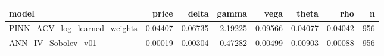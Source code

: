 \begin{tabular}{lrrrrrrr}
\toprule
model & price & delta & gamma & vega & theta & rho & n \\
\midrule
PINN_ACV_log_learned_weights & 0.04407 & 0.06735 & 2.19225 & 0.09566 & 0.04077 & 0.04042 & 956 \\
ANN_IV_Sobolev_v01 & 0.00019 & 0.00304 & 0.47282 & 0.00499 & 0.00903 & 0.00088 & 956 \\
\bottomrule
\end{tabular}
